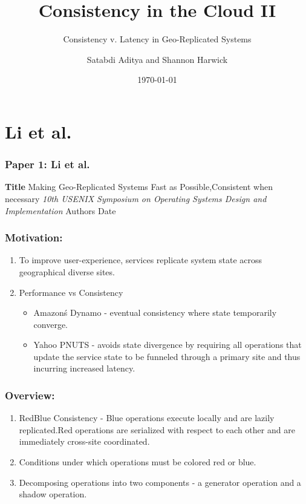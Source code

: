 \documentclass{beamer}
\title{Consistency in the Cloud II}
\subtitle{Consistency v. Latency in Geo-Replicated Systems}
\author{Satabdi Aditya and Shannon Harwick}
\institute{University of Illinois at Chicago}
\date{\today}
\begin{document}

\section{Li et al.} 

\begin{frame}
\frametitle{Paper 1: Li et al.}

\textbf{Title} Making Geo-Replicated Systems Fast as Possible,Consistent when necessary\newline
\textit{10th USENIX Symposium on Operating Systems Design and Implementation} \newline
Authors\newline
Date\newline

\end{frame}


\begin{frame}
\frametitle{Motivation:}
\begin{enumerate}
\item To improve user-experience, services replicate  system state across geographical diverse sites.
\item Performance vs Consistency
\begin{itemize}
\item Amazon\'s Dynamo - eventual consistency where state temporarily converge.
\item Yahoo PNUTS - avoids state divergence by requiring all operations that update the service state to be funneled through a primary site and thus incurring increased latency.
\end{itemize}
\end{enumerate}

\end{frame}



\begin{frame}
\frametitle{Overview:}
\begin{enumerate}
\item RedBlue Consistency - Blue operations execute locally and are lazily replicated.Red operations are serialized with respect to each other and are immediately cross-site coordinated.
\item Conditions under which operations must be colored red or blue.
\item Decomposing operations into two components - a generator operation and a shadow operation.
\end{enumerate}

\end{frame}
\end{document}
